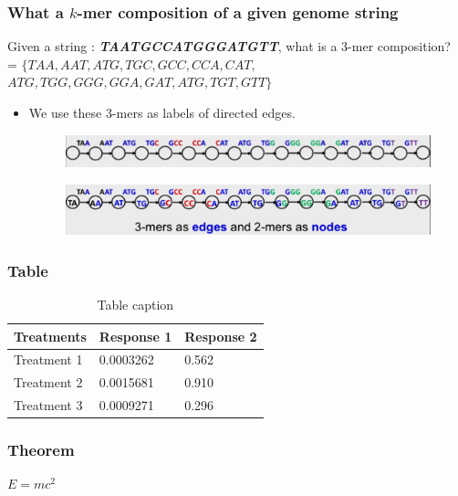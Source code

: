 \documentclass{beamer}
\begin{document}
\begin{frame}
\frametitle{What a $k$-mer composition of a given genome string}

Given a string : \textbf{\textit{TAATGCCATGGGATGTT}}, what is a 3-mer composition?\\
= $\{TAA, AAT, ATG, TGC, GCC, CCA, CAT,$\\ $ ATG, TGG, GGG, GGA, GAT, ATG, TGT, GTT\}$
\begin{itemize}
\item We use these 3-mers as labels of directed edges.
\pause
\begin{figure}[h]
\includegraphics[scale = 0.4]{3mer.png}
\end{figure}
\pause
\begin{figure}[h]
\includegraphics[scale = 0.4]{3mer2mer.png}
\end{figure}
\end{itemize}
\end{frame}


\begin{frame}
\frametitle{Table}
\begin{table}
\begin{tabular}{l l l}
\toprule
\textbf{Treatments} & \textbf{Response 1} & \textbf{Response 2}\\
\midrule
Treatment 1 & 0.0003262 & 0.562 \\
Treatment 2 & 0.0015681 & 0.910 \\
Treatment 3 & 0.0009271 & 0.296 \\
\bottomrule
\end{tabular}
\caption{Table caption}
\end{table}
\end{frame}


\begin{frame}
\frametitle{Theorem}
\begin{theorem}
$E = mc^2$
\end{theorem}
\end{frame}
\end{document}
